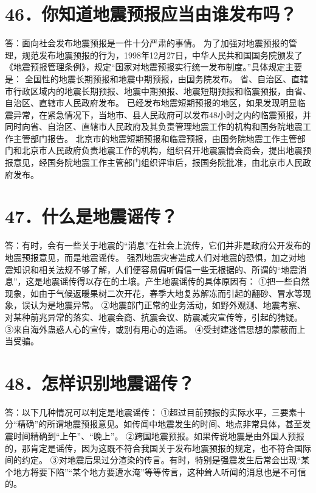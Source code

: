 \documentclass[a4paper,10pt,english]{sphinxmanual}
\begin{document}
\section{46．你知道地震预报应当由谁发布吗？}
\label{\detokenize{index:id52}}
答：面向社会发布地震预报是一件十分严肃的事情。
为了加强对地震预报的管理，规范发布地震预报的行为，1998年12月27日，中华人民共和国国务院颁发了《地震预报管理条例》，规定“国家对地震预报实行统一发布制度。”具体规定主要是：
全国性的地震长期预报和地震中期预报，由国务院发布。
省、自治区、直辖市行政区域内的地震长期预报、地震中期预报、地震短期预报和临震预报，由省、自治区、直辖市人民政府发布。
已经发布地震短期预报的地区，如果发现明显临震异常，在紧急情况下，当地市、县人民政府可以发布48小时之内的临震预报，并同时向省、自治区、直辖市人民政府及其负责管理地震工作的机构和国务院地震工作主管部门报告。
北京市的地震短期预报和临震预报，由国务院地震工作主管部门和北京市人民政府负责地震工作的机构，组织召开地震震情会商会，提出地震预报意见，经国务院地震工作主管部门组织评审后，报国务院批准，由北京市人民政府发布。


\section{47．什么是地震谣传？}
\label{\detokenize{index:id53}}
答：有时，会有一些关于地震的“消息”在社会上流传，它们并非是政府公开发布的地震预报意见，而是地震谣传。
强烈地震灾害造成人们对地震的恐惧，加之对地震知识和相关法规不够了解，人们便容易偏听偏信一些无根据的、所谓的“地震消息”，这是地震谣传得以存在的土壤。产生地震谣传的具体原因有：
①把一些自然现象，如由于气候返暖果树二次开花，春季大地复苏解冻而引起的翻砂、冒水等现象，误认为是地震异常。
②地震部门正常的业务活动，如野外观测、地震考察、对某种前兆异常的落实、地震会商、抗震会议、防震减灾宣传等，引起的猜疑。
③来自海外蛊惑人心的宣传，或别有用心的造谣。
④受封建迷信思想的蒙蔽而上当受骗。


\section{48．怎样识别地震谣传？}
\label{\detokenize{index:id54}}
答：以下几种情况可以判定是地震谣传：
①超过目前预报的实际水平，三要素十分“精确”的所谓地震预报意见。如传闻中地震发生的时间、地点非常具体，甚至发震时间精确到“上午”、“晚上”。
②跨国地震预报。如果传说地震是由外国人预报的，那肯定是谣传，因为这既不符合我国关于发布地震预报的规定，也不符合国际间的约定。
③对地震后果过分渲染的传言。有时，特别是强震发生后常会出现“某个地方将要下陷”“某个地方要遭水淹”等等传言，这种耸人听闻的消息也是不可信的。
\end{document}
